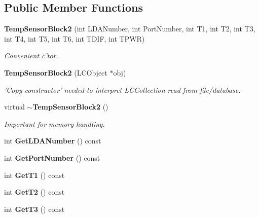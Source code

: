 \subsection*{Public Member Functions}
\begin{DoxyCompactItemize}
\item 
{\bf Temp\-Sensor\-Block2} (int L\-D\-A\-Number, int Port\-Number, int T1, int T2, int T3, int T4, int T5, int T6, int T\-D\-I\-F, int T\-P\-W\-R)\label{classCALICE_1_1TempSensorBlock2_a54e191771f53ca8f7cbb1515d7aca02f}

\begin{DoxyCompactList}\small\item\em Convenient c'tor. \end{DoxyCompactList}\item 
{\bf Temp\-Sensor\-Block2} (L\-C\-Object $\ast$obj)\label{classCALICE_1_1TempSensorBlock2_a38018a53d6021897d93a8c5dceb4d414}

\begin{DoxyCompactList}\small\item\em 'Copy constructor' needed to interpret L\-C\-Collection read from file/database. \end{DoxyCompactList}\item 
virtual {\bf $\sim$\-Temp\-Sensor\-Block2} ()\label{classCALICE_1_1TempSensorBlock2_af5f34f2ff55c040772d6608011f215be}

\begin{DoxyCompactList}\small\item\em Important for memory handling. \end{DoxyCompactList}\item 
int {\bfseries Get\-L\-D\-A\-Number} () const \label{classCALICE_1_1TempSensorBlock2_a13a5db490dd71b4986d7f9a9f8305ed5}

\item 
int {\bfseries Get\-Port\-Number} () const \label{classCALICE_1_1TempSensorBlock2_ac954ae46175ebe0fc480e4961645149a}

\item 
int {\bfseries Get\-T1} () const \label{classCALICE_1_1TempSensorBlock2_aec4184305621faf41a9ad39a0b70eb34}

\item 
int {\bfseries Get\-T2} () const \label{classCALICE_1_1TempSensorBlock2_a910deb622a4882de3c245cdd74a792ed}

\item 
int {\bfseries Get\-T3} () const \label{classCALICE_1_1TempSensorBlock2_abec6d13fe16bb8e9afabbd7eabdc0dbc}


\end{DoxyCompactItemize}
